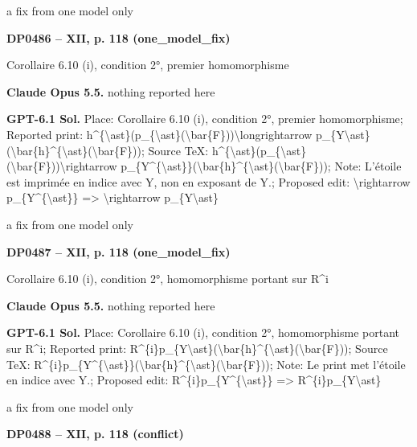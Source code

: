 a fix from one model only\par
\par\noindent\hypertarget{DP0486}{}\textbf{DP0486 -- XII, p. 118 (one\_model\_fix)}\par
Corollaire 6.10 (i), condition 2°, premier homomorphisme\par
\textbf{Claude Opus 5.5.} nothing reported here\par
\textbf{GPT-6.1 Sol.} Place: Corollaire 6.10 (i), condition 2°, premier homomorphisme; Reported print: h\textasciicircum{}\{\textbackslash{}ast\}(p\_\{\textbackslash{}ast\}(\textbackslash{}bar\{F\}))\textbackslash{}longrightarrow p\_\{Y\textbackslash{}ast\}(\textbackslash{}bar\{h\}\textasciicircum{}\{\textbackslash{}ast\}(\textbackslash{}bar\{F\})); Source TeX: h\textasciicircum{}\{\textbackslash{}ast\}(p\_\{\textbackslash{}ast\}(\textbackslash{}bar\{F\}))\textbackslash{}rightarrow p\_\{Y\textasciicircum{}\{\textbackslash{}ast\}\}(\textbackslash{}bar\{h\}\textasciicircum{}\{\textbackslash{}ast\}(\textbackslash{}bar\{F\})); Note: L'étoile est imprimée en indice avec Y, non en exposant de Y.; Proposed edit: \textbackslash{}rightarrow p\_\{Y\textasciicircum{}\{\textbackslash{}ast\}\} =\allowbreak > \textbackslash{}rightarrow p\_\{Y\textbackslash{}ast\}\par
a fix from one model only\par
\par\noindent\hypertarget{DP0487}{}\textbf{DP0487 -- XII, p. 118 (one\_model\_fix)}\par
Corollaire 6.10 (i), condition 2°, homomorphisme portant sur R\textasciicircum{}i\par
\textbf{Claude Opus 5.5.} nothing reported here\par
\textbf{GPT-6.1 Sol.} Place: Corollaire 6.10 (i), condition 2°, homomorphisme portant sur R\textasciicircum{}i; Reported print: R\textasciicircum{}\{i\}p\_\{Y\textbackslash{}ast\}(\textbackslash{}bar\{h\}\textasciicircum{}\{\textbackslash{}ast\}(\textbackslash{}bar\{F\})); Source TeX: R\textasciicircum{}\{i\}p\_\{Y\textasciicircum{}\{\textbackslash{}ast\}\}(\textbackslash{}bar\{h\}\textasciicircum{}\{\textbackslash{}ast\}(\textbackslash{}bar\{F\})); Note: Le print met l'étoile en indice avec Y.; Proposed edit: R\textasciicircum{}\{i\}p\_\{Y\textasciicircum{}\{\textbackslash{}ast\}\} =\allowbreak > R\textasciicircum{}\{i\}p\_\{Y\textbackslash{}ast\}\par
a fix from one model only\par
\par\noindent\hypertarget{DP0488}{}\textbf{DP0488 -- XII, p. 118 (conflict)}\par
